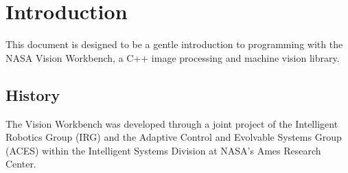 \chapter{Introduction}

This document is designed to be a gentle introduction to programming
with the NASA Vision Workbench, a C++ image processing and machine
vision library.

\section{History}
The Vision Workbench was developed through a joint
project of the Intelligent Robotics Group (IRG) and the Adaptive
Control and Evolvable Systems Group (ACES) within the Intelligent
Systems Division at NASA's Ames Research Center.
